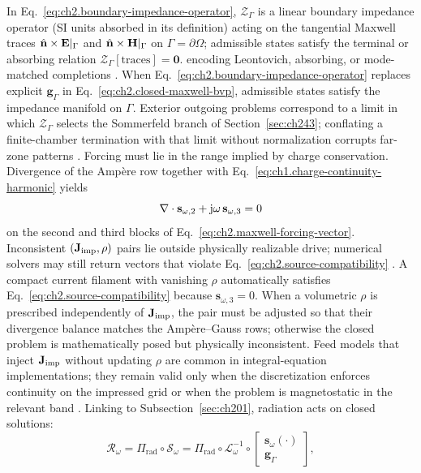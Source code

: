 In Eq.~\eqref{eq:ch2.boundary-impedance-operator},
\(\mathcal{Z}_\Gamma\) is a linear boundary impedance operator (SI units absorbed in its
definition) acting on the tangential Maxwell traces
\(\hat{\mathbf{n}}\times\mathbf{E}|_{\Gamma}\) and \(\hat{\mathbf{n}}\times\mathbf{H}|_{\Gamma}\) on
\(\Gamma=\partial\Omega\); admissible states satisfy the terminal or absorbing relation
\(\mathcal{Z}_\Gamma[\text{traces}]=\mathbf{0}\).
encoding Leontovich, absorbing, or mode-matched completions \cite{harrington2001}.
When Eq.~\eqref{eq:ch2.boundary-impedance-operator} replaces explicit
\(\mathbf{g}_\Gamma\) in Eq.~\eqref{eq:ch2.closed-maxwell-bvp}, admissible states
satisfy the impedance manifold on \(\Gamma\). Exterior outgoing problems correspond
to a limit in which \(\mathcal{Z}_\Gamma\) selects the Sommerfeld branch of
Section~\ref{sec:ch243}; conflating a finite-chamber termination with that limit
without normalization corrupts far-zone patterns \cite{stratton1941}.
Forcing must lie in the range implied by charge conservation. Divergence of the
Amp\`ere row together with Eq.~\eqref{eq:ch1.charge-continuity-harmonic} yields
\begin{equation}
\label{eq:ch2.source-compatibility}
\nabla\cdot\mathbf{s}_{\omega,2}+\mathrm{j}\omega\,\mathbf{s}_{\omega,3}=0
\end{equation}
on the second and third blocks of Eq.~\eqref{eq:ch2.maxwell-forcing-vector}.
Inconsistent \((\mathbf{J}_{\mathrm{imp}},\rho)\) pairs lie outside physically realizable drive;
numerical solvers may still return vectors that violate
Eq.~\eqref{eq:ch2.source-compatibility} \cite{stratton1941}. A compact
current filament with vanishing \(\rho\) automatically satisfies
Eq.~\eqref{eq:ch2.source-compatibility} because \(\mathbf{s}_{\omega,3}=0\).
When a volumetric \(\rho\) is prescribed independently of \(\mathbf{J}_{\mathrm{imp}}\), the pair
must be adjusted so that their divergence balance matches the Amp\`ere--Gauss
rows; otherwise the closed problem is mathematically posed but physically
inconsistent. Feed models that inject \(\mathbf{J}_{\mathrm{imp}}\) without updating \(\rho\) are
common in integral-equation implementations; they remain valid only when the
discretization enforces continuity on the impressed grid or when the problem
is magnetostatic in the relevant band \cite{harrington2001}.
Linking to Subsection~\ref{sec:ch201}, radiation acts on closed solutions:
\begin{equation}
\label{eq:ch2.maxwell-radiation-composition}
\mathcal{R}_\omega=\Pi_{\mathrm{rad}}\circ\mathcal{S}_\omega
=\Pi_{\mathrm{rad}}\circ\mathcal{L}_\omega^{-1}\circ
\begin{bmatrix}\mathbf{s}_\omega(\cdot)\\ \mathbf{g}_\Gamma\end{bmatrix},
\end{equation}
